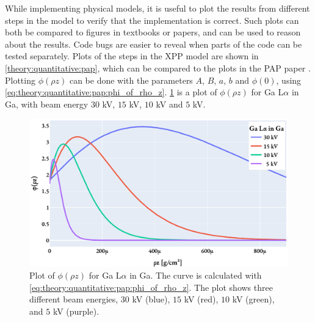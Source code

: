 While implementing physical models, it is useful to plot the results from different steps in the model to verify that the implementation is correct.
Such plots can both be compared to figures in textbooks or papers, and can be used to reason about the results.
Code bugs are easier to reveal when parts of the code can be tested separately.
Plots of the steps in the XPP model are shown in \cref{theory:quantitative:pap}, which can be compared to the plots in the PAP paper \cite{pap_1991}.
Plotting $\phi(\rho z)$ can be done with the parameters $A$, $B$, $a$, $b$ and $\phi(0)$, using \cref{eq:theory:quantitative:pap:phi_of_rho_z}.
\cref{fig:discussion:pap:phi_of_rhoz} is a plot of $\phi(\rho z)$ for Ga L$\alpha$ in Ga, with beam energy $30$ kV, $15$ kV, $10$ kV and $5$ kV.

\begin{figure}[htbp]
    \centering
    \includegraphics[width=0.8\linewidth]{figures/discussion/PAP_phi_of_rhoz.pdf}
    \caption{
        Plot of $\phi(\rho z)$ for Ga L$\alpha$ in Ga.
        The curve is calculated with \cref{eq:theory:quantitative:pap:phi_of_rho_z}.
        The plot shows three different beam energies, $30$ kV (blue), $15$ kV (red), $10$ kV (green), and $5$ kV (purple).
    }
    \label{fig:discussion:pap:phi_of_rhoz}
\end{figure}


